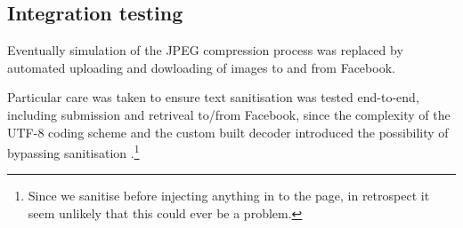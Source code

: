 \subsection{Integration testing}

Eventually simulation of the JPEG compression process was replaced by automated uploading and dowloading of images to and from Facebook.

Particular care was taken to ensure text sanitisation was tested end-to-end, including submission and retriveal to/from Facebook, since the complexity of the UTF-8 coding scheme and the custom built decoder introduced the possibility of bypassing sanitisation \cite{utf8}.\footnote{Since we sanitise before injecting anything in to the page, in retrospect it seem unlikely that this could ever be a problem.}
